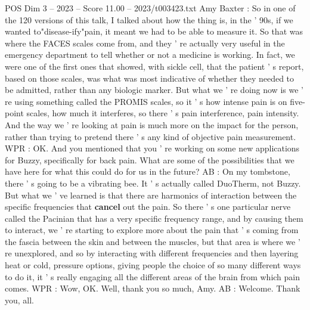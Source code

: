 \begin{textsample}{POS Dim 3 – 2023 – Score 11.00 – 2023/t003423.txt}
Amy Baxter : So in one of the 120 versions of this talk, I talked about how the thing is, in the ' 90s, if we wanted to"disease-ify"pain, it meant we had to be able to measure it.
So that was where the FACES scales come from, and they ' re actually very useful in the emergency department to tell whether or not a medicine is working.
In fact, we were one of the first ones that showed, with sickle cell, that the patient ' s report, based on those scales, was what was most indicative of whether they needed to be admitted, rather than any biologic marker.
But what we ' re doing now is we ' re using something called the PROMIS scales, so it ' s how intense pain is on five-point scales, how much it interferes, so there ' s pain interference, pain intensity.
And the way we ' re looking at pain is much more on the impact for the person, rather than trying to pretend there ' s any kind of objective pain measurement.
WPR : OK.
And you mentioned that you ' re working on some new applications for Buzzy, specifically for back pain.
What are some of the possibilities that we have here for what this could do for us in the future?
AB : On my tombstone, there ' s going to be a vibrating bee.
It ' s actually called DuoTherm, not Buzzy.
But what we ' ve learned is that there are harmonics of interaction between the specific frequencies that \textbf{cancel} out the pain.
So there ' s one particular nerve called the Pacinian that has a very specific frequency range, and by causing them to interact, we ' re starting to explore more about the pain that ' s coming from the fascia between the skin and between the muscles, but that area is where we ' re unexplored, and so by interacting with different frequencies and then layering heat or cold, pressure options, giving people the choice of so many different ways to do it, it ' s really engaging all the different areas of the brain from which pain comes.
WPR : Wow, OK.
Well, thank you so much, Amy.
AB : Welcome.
Thank you, all.

\end{textsample}

